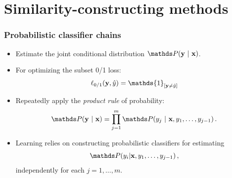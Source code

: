 \documentclass[11pt,compress,t,notes=noshow, xcolor=table]{beamer}
\begin{document}
\section{Similarity-constructing methods}




\begin{frame}
	\frametitle{Probabilistic classifier chains}
	
	\begin{itemize}
		\item Estimate the \alert{joint} conditional distribution $\P(\yv ~|~  \xv)$. 
		\item For optimizing the \alert{subset 0/1} loss:  $$ \ell_{0/1}(\yv, \hat{y}) = \mathds{1}_{[\yv \ne \hat{y}]}$$
		\item Repeatedly apply the \emph{product rule} of probability:
		$$
		\P(\yv ~|~ \xv) = \prod_{j=1}^{m} \P(y_j ~|~ \xv, y_1, \ldots,y_{j-1}) \, .
		$$
		\item  Learning relies on constructing \alert{probabilistic classifiers} for estimating 
		$$
		\P( y_i|\xv, y_1, \ldots,y_{j-1}) \,,
		$$
		{independently} for each $j = 1, \ldots, m$. 
	\end{itemize}
\end{frame}
\end{document}
